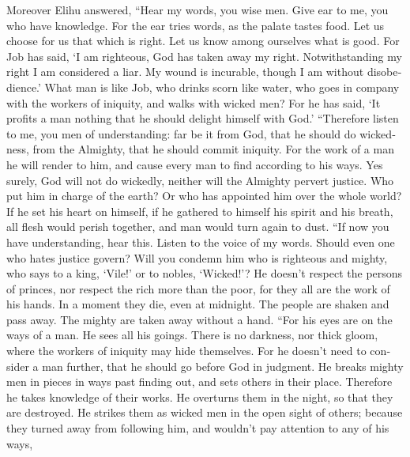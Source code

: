 \begin{paracol}{2}
\begin{otherlanguage}{english}
 Moreover Elihu answered,  ``Hear my words,
you wise men. Give ear to me, you who have knowledge.  For
the ear tries words, as the palate tastes food.  Let us
choose for us that which is right. Let us know among ourselves what is
good.  For Job has said, `I am righteous, God has taken
away my right.  Notwithstanding my right I am considered a
liar. My wound is incurable, though I am without disobedience.'
 What man is like Job, who drinks scorn like water,
 who goes in company with the workers of iniquity, and
walks with wicked men?  For he has said, `It profits a man
nothing that he should delight himself with God.' 
``Therefore listen to me, you men of understanding: far be it from God,
that he should do wickedness, from the Almighty, that he should commit
iniquity.  For the work of a man he will render to him,
and cause every man to find according to his ways.  Yes
surely, God will not do wickedly, neither will the Almighty pervert
justice.  Who put him in charge of the earth? Or who has
appointed him over the whole world?  If he set his heart
on himself, if he gathered to himself his spirit and his breath,
 all flesh would perish together, and man would turn
again to dust.  ``If now you have understanding, hear
this. Listen to the voice of my words.  Should even one
who hates justice govern? Will you condemn him who is righteous and
mighty,  who says to a king, `Vile!' or to nobles,
`Wicked!'?  He doesn't respect the persons of princes,
nor respect the rich more than the poor, for they all are the work of
his hands.  In a moment they die, even at midnight. The
people are shaken and pass away. The mighty are taken away without a
hand.  ``For his eyes are on the ways of a man. He sees
all his goings.  There is no darkness, nor thick gloom,
where the workers of iniquity may hide themselves.  For
he doesn't need to consider a man further, that he should go before God
in judgment.  He breaks mighty men in pieces in ways past
finding out, and sets others in their place.  Therefore
he takes knowledge of their works. He overturns them in the night, so
that they are destroyed.  He strikes them as wicked men
in the open sight of others;  because they turned away
from following him, and wouldn't pay attention to any of his ways,

\end{otherlanguage}
\end{paracol}
